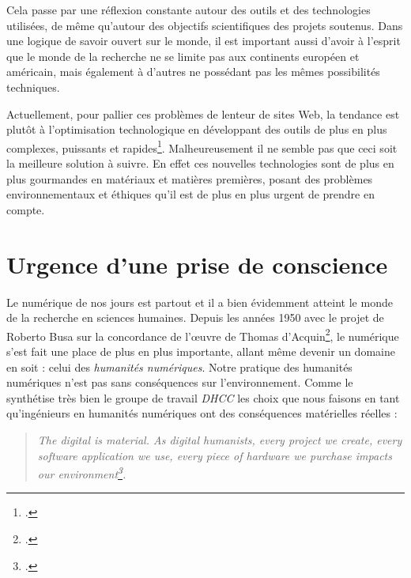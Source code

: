 \documentclass[a4paper,12pt,twoside]{book}
\begin{document}
Cela passe par une réflexion constante autour des outils et des technologies utilisées, de même qu'autour des objectifs scientifiques des projets soutenus. Dans une logique de savoir ouvert sur le monde, il est important aussi d'avoir à l'esprit que le monde de la recherche ne se limite pas aux continents européen et américain, mais également à d'autres ne possédant pas les mêmes possibilités techniques.

Actuellement, pour pallier ces problèmes de lenteur de sites Web, la tendance est plutôt à l'optimisation technologique en développant des outils de plus en plus complexes, puissants et rapides\footcite{sixg}. Malheureusement il ne semble pas que ceci soit la meilleure solution à suivre. En effet ces nouvelles technologies sont de plus en plus gourmandes en matériaux et matières premières, posant des problèmes environnementaux et éthiques qu'il est de plus en plus urgent de prendre en compte.


\section{Urgence d'une prise de conscience}
Le numérique de nos jours est partout et il a bien évidemment atteint le monde de la recherche en sciences humaines. Depuis les années 1950 avec le projet de Roberto Busa sur la concordance de l'\oe{}uvre de Thomas d'Acquin\footcite{kinsella_review_1997}, le numérique s'est fait une place de plus en plus importante, allant même devenir un domaine en soit : celui des \textit{humanités numériques}.
Notre pratique des humanités numériques n'est pas sans conséquences sur l'environnement. Comme le synthétise très bien le groupe de travail \textit{\acrfull{DHCC}} les choix que nous faisons en tant qu'ingénieurs en humanités numériques ont des conséquences matérielles réelles :

\begin{otherlanguage}{english}
\begin{quote}
    \textit{The digital is material. As digital humanists, every project we create, every software application we use, every piece of hardware we purchase impacts our environment\footcite{DHCC}.}
\end{quote}
\end{otherlanguage}
\end{document}
